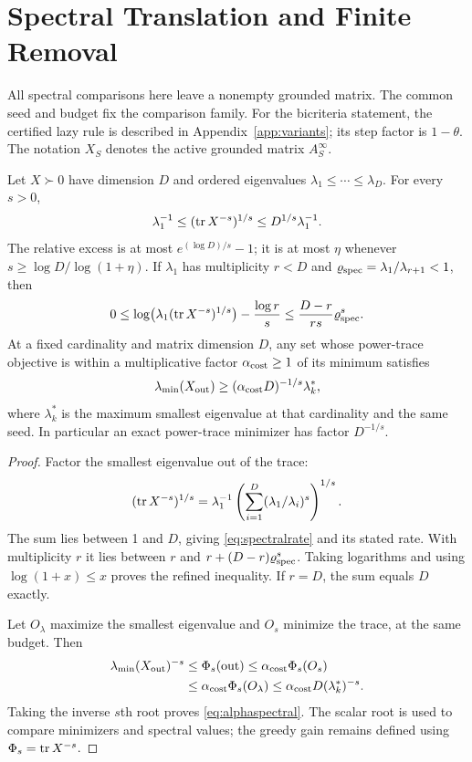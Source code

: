 \section{Spectral Translation and Finite Removal}\label{app:spectral}

All spectral comparisons here leave a nonempty grounded matrix.
The common seed and budget fix the comparison family.
For the bicriteria statement, the certified lazy rule is described
in Appendix~\ref{app:variants}; its step factor is $1-\theta$.
The notation $X_S$ denotes the active grounded matrix $A_S^\infty$.
\begin{theorem}\label{thm:spectralrate}
Let $X\succ0$ have dimension $D$ and ordered eigenvalues
$\lambda_1\leq\cdots\leq\lambda_D$. For every $s>0$,
\begin{equation}\label{eq:spectralrate}
 \lambda_1^{-1}\leq(\operatorname{tr} X^{-s})^{1/s}
          \leq D^{1/s}\lambda_1^{-1}.
\end{equation}
The relative excess is at most $e^{(\log D)/s}-1$; it is at most
$\eta$ whenever $s\geq\log D/\log(1+\eta)$.
If $\lambda_1$ has multiplicity $r<D$ and
$\varrho_{\rm spec}=\lambda_1/\lambda_{r+1}<1$, then
\[
 0\leq\log\bigl(\lambda_1(\operatorname{tr} X^{-s})^{1/s}\bigr)
           -\frac{\log r}{s}
 \leq\frac{D-r}{rs}\varrho_{\rm spec}^s.
\]
At a fixed cardinality and matrix dimension $D$, any set whose
power-trace objective is within a multiplicative factor $\alpha_{\rm cost}\geq1$
of its minimum satisfies
\begin{equation}\label{eq:alphaspectral}
 \lambda_{\min}(X_{\rm out})
     \geq(\alpha_{\rm cost} D)^{-1/s}\lambda_k^*,
\end{equation}
where $\lambda_k^*$ is the maximum smallest eigenvalue at that
cardinality and the same seed. In particular an exact power-trace
minimizer has factor $D^{-1/s}$.
\end{theorem}
\begin{proof}
Factor the smallest eigenvalue out of the trace:
\[
 (\operatorname{tr} X^{-s})^{1/s}
 =\lambda_1^{-1}
    \left(\sum_{i=1}^D(\lambda_1/\lambda_i)^s\right)^{1/s}.
\]
The sum lies between 1 and $D$, giving \eqref{eq:spectralrate}
and its stated rate. With multiplicity $r$ it lies between $r$
and $r+(D-r)\varrho_{\rm spec}^s$. Taking logarithms and using
$\log(1+x)\leq x$ proves the refined inequality. If $r=D$, the
sum equals $D$ exactly.

Let $O_\lambda$ maximize the smallest eigenvalue and $O_s$ minimize
the trace, at the same budget. Then
\begin{align*}
 \lambda_{\min}(X_{\rm out})^{-s}
 &\leq\Phi_s({\rm out})\leq\alpha_{\rm cost}\Phi_s(O_s)\\
 &\leq\alpha_{\rm cost}\Phi_s(O_\lambda)
 \leq\alpha_{\rm cost} D(\lambda_k^*)^{-s}.
\end{align*}
Taking the inverse $s$th root proves \eqref{eq:alphaspectral}.
The scalar root is used to compare minimizers and spectral values;
the greedy gain remains defined using $\Phi_s=\operatorname{tr} X^{-s}$.
\end{proof}

